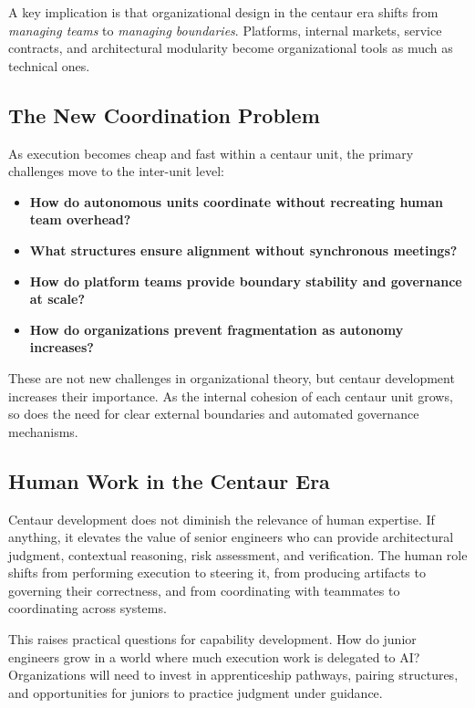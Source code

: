 \documentclass[11pt, a4paper, twocolumn]{article} %
\begin{document}
A key implication is that organizational design in the centaur era shifts from
\emph{managing teams} to \emph{managing boundaries}. Platforms, internal markets,
service contracts, and architectural modularity become organizational tools as
much as technical ones.

\subsection*{The New Coordination Problem}

As execution becomes cheap and fast within a centaur unit, the primary challenges
move to the inter-unit level:

\begin{itemize}
    \item \textbf{How do autonomous units coordinate without recreating human team overhead?}
    \item \textbf{What structures ensure alignment without synchronous meetings?}
    \item \textbf{How do platform teams provide boundary stability and governance at scale?}
    \item \textbf{How do organizations prevent fragmentation as autonomy increases?}
\end{itemize}

These are not new challenges in organizational theory, but centaur development
increases their importance. As the internal cohesion of each centaur unit grows,
so does the need for clear external boundaries and automated governance
mechanisms.

\subsection*{Human Work in the Centaur Era}

Centaur development does not diminish the relevance of human expertise. If
anything, it elevates the value of senior engineers who can provide architectural
judgment, contextual reasoning, risk assessment, and verification. The human role
shifts from performing execution to steering it, from producing artifacts to
governing their correctness, and from coordinating with teammates to coordinating
across systems.

This raises practical questions for capability development. How do junior
engineers grow in a world where much execution work is delegated to AI?
Organizations will need to invest in apprenticeship pathways, pairing structures,
and opportunities for juniors to practice judgment under guidance.
\end{document}
